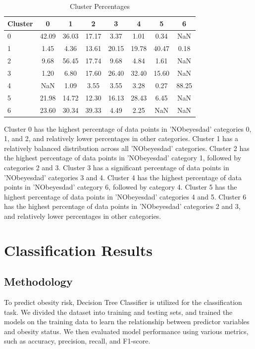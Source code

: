 \documentclass[conference]{IEEEtran}
\begin{document}
\begin{table}[htbp]
    \centering
    \caption{Cluster Percentages}
    \begin{tabular}{lccccccc}
        \toprule
        Cluster & 0 & 1 & 2 & 3 & 4 & 5 & 6 \\
        \midrule
        0 & 42.09 & 36.03 & 17.17 & 3.37 & 1.01 & 0.34 & NaN \\
        1 & 1.45 & 4.36 & 13.61 & 20.15 & 19.78 & 40.47 & 0.18 \\
        2 & 9.68 & 56.45 & 17.74 & 9.68 & 4.84 & 1.61 & NaN \\
        3 & 1.20 & 6.80 & 17.60 & 26.40 & 32.40 & 15.60 & NaN \\
        4 & NaN & 1.09 & 3.55 & 3.55 & 3.28 & 0.27 & 88.25 \\
        5 & 21.98 & 14.72 & 12.30 & 16.13 & 28.43 & 6.45 & NaN \\
        6 & 23.60 & 30.34 & 39.33 & 4.49 & 2.25 & NaN & NaN \\
        \bottomrule
    \end{tabular}
\end{table}
Cluster 0 has the highest percentage of data points in 'NObeyesdad' categories 0, 1, and 2, and relatively lower percentages in other categories.
Cluster 1 has a relatively balanced distribution across all 'NObeyesdad' categories.
Cluster 2 has the highest percentage of data points in 'NObeyesdad' category 1, followed by categories 2 and 3.
Cluster 3 has a significant percentage of data points in 'NObeyesdad' categories 3 and 4.
Cluster 4 has the highest percentage of data points in 'NObeyesdad' category 6, followed by category 4.
Cluster 5 has the highest percentage of data points in 'NObeyesdad' categories 4 and 5.
Cluster 6 has the highest percentage of data points in 'NObeyesdad' categories 2 and 3, and relatively lower percentages in other categories.



\section{Classification Results}

\subsection{Methodology}\label{AA}
To predict obesity risk, Decision Tree Classifier is utilized for the classification task. We divided the dataset into training and testing sets, and trained the models on the training data to learn the relationship between predictor variables and obesity status. We then evaluated model performance using various metrics, such as accuracy, precision, recall, and F1-score.
\end{document}
